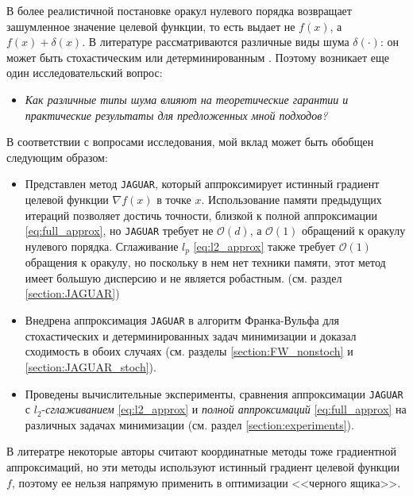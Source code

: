    В более реалистичной постановке оракул нулевого порядка возвращает зашумленное значение целевой функции, то есть выдает не $f(x)$, а $f(x) + \delta(x)$. В литературе рассматриваются различные виды шума $\delta(\cdot)$: он может быть стохастическим \cite{bach2016highly, doi:10.1137/19M1259225, akhavan2020exploiting, gasnikov2022power} или детерминированным \cite{risteski2016algorithms, bogolubsky2016learning, sahu2018distributed, bayandina2018gradient, dvinskikh2022noisy, lobanov2023non}. Поэтому возникает еще один исследовательский вопрос:

    \begin{itemize}
        \item \textit{Как различные типы шума влияют на теоретические гарантии и практические результаты для предложенных мной подходов?}
    \end{itemize}
    
    В соответствии с вопросами исследования, мой вклад может быть обобщен следующим образом:

    \begin{itemize}
        \item Представлен метод \texttt{JAGUAR}, который аппроксимирует истинный градиент целевой функции $\nabla f(x)$ в точке $x$. Использование памяти предыдущих итераций позволяет достичь точности, близкой к полной аппроксимации \eqref{eq:full_approx}, но \texttt{JAGUAR} требует не $\mathcal{O}(d)$, а $\mathcal{O}(1)$ обращений к оракулу нулевого порядка. Сглаживание $l_p$ \eqref{eq:l2_approx} также требует $\mathcal{O}(1)$ обращения к оракулу, но поскольку в нем нет техники памяти, этот метод имеет большую дисперсию и не является робастным. (см. раздел \eqref{section:JAGUAR})
        \item Внедрена аппроксимация \texttt{JAGUAR} в алгоритм Франка-Вульфа для стохастических и детерминированных задач минимизации и доказал сходимость в обоих случаях (см. разделы \ref{section:FW_nonstoch} и \ref{section:JAGUAR_stoch}). 
        \item Проведены вычислительные эксперименты, сравнения аппроксимации \texttt{JAGUAR} с $l_2$-\textit{сглаживанием} \eqref{eq:l2_approx} и \textit{полной аппроксимаций} \eqref{eq:full_approx} на различных задачах минимизации (см. раздел \ref{section:experiments}).
    \end{itemize}

    В литератре некоторые авторы считают координатные методы \cite{lacoste2013block} тоже градиентной аппроксимаций, но эти методы используют истинный градиент целевой функции $f$, поэтому ее нельзя напрямую применить в оптимизации <<черного ящика>>.

